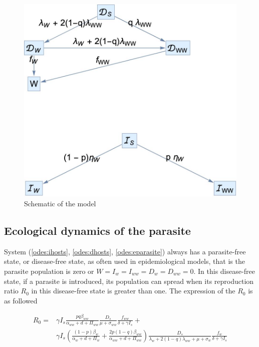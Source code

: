 \documentclass{article}
\begin{document}
\begin{figure}
\includegraphics[width=\textwidth]{Figures/schematic}
\caption{Schematic of the model}
\label{fig:schematic}
\end{figure}

\subsection{Ecological dynamics of the parasite}

System (\ref{odes:ihosts}, \ref{odes:dhosts}, \ref{odes:eparasite}) always has a parasite-free state, or disease-free state, as often used in epidemiological models, that is the parasite population is zero or $W = I_w = I_{ww} = D_w = D_{ww} = 0$. In this disease-free state, if a parasite is introduced, its population can spread when its reproduction ratio $R_0$ in this disease-free state is greater than one. The expression of the $R_0$ is as followed

\begin{align}
R_0 = & \gamma I_s \frac{ p q \beta_{ww}}{\alpha_{ww} + d + \Pi_{ww}} \frac{D_s}{\mu +\sigma_{ww}} \frac{f_{ww}}{\delta +\gamma I_s} + \nonumber \\
& \gamma  I_s \left( \frac{ (1-p)\beta_w}{\alpha_w + d + \Pi_w} + \frac{2 p (1-q) \beta_{ww}}{\alpha_{ww} + d + \Pi_{ww}} \right) \frac{D_s}{\lambda_w + 2 (1-q) \lambda_{ww}  + \mu + \sigma_w} \frac{f_w}{\delta +\gamma  I_s}
\end{align}
\end{document}
